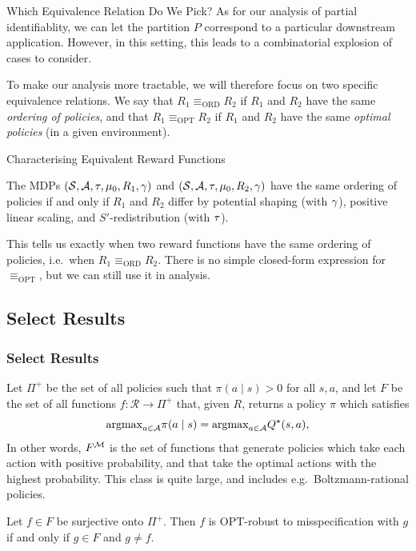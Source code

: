 \documentclass{beamer}
\begin{document}
\begin{frame}{Which Equivalence Relation Do We Pick?}
    \small
    As for our analysis of partial identifiablity, we can let the partition $P$ correspond to a particular downstream application. However, in this setting, this leads to a combinatorial explosion of cases to consider.

    \vspace{0.5cm}
    To make our analysis more tractable, we will therefore focus on two specific equivalence relations. We say that $R_1 \equiv_\mathrm{ORD} R_2$ if $R_1$ and $R_2$ have the same \emph{ordering of policies}, and that $R_1 \equiv_\mathrm{OPT} R_2$ if $R_1$ and $R_2$ have the same \emph{optimal policies} (in a given environment).
\end{frame}

\begin{frame}{Characterising Equivalent Reward Functions}
    \small
    \begin{theorem}%
    The MDPs $(\mathcal{S}, \mathcal{A}, \tau, \mu_0, 
    R_1, \gamma)$ and $(\mathcal{S}, \mathcal{A}, \tau, \mu_0, 
    R_2, \gamma)$ have the same ordering of policies if and only if $R_1$ and $R_2$ differ by potential shaping (with $\gamma$), positive linear scaling, and $S'$-redistribution (with $\tau$).%
    \end{theorem}
    \vspace{0.5cm}
    This tells us exactly when two reward functions have the same ordering of policies, i.e.\ when $R_1 \equiv_\mathrm{ORD} R_2$. There is no simple closed-form expression for $\equiv_\mathrm{OPT}$, but we can still use it in analysis.
\end{frame}

\subsection{Select Results}

\begin{frame}
    \frametitle{Select Results}
    \small
    Let $\Pi^+$ be the set of all policies such that $\pi(a \mid s) > 0$ for all $s,a$, and let $F$ be the set of all functions $f : \mathcal{R} \rightarrow \Pi^+$ that, given $R$, returns a policy $\pi$ which satisfies
    \begin{equation*}
        \mathrm{argmax}_{a \in \mathcal{A}} \pi(a \mid s) = \mathrm{argmax}_{a \in \mathcal{A}} Q^\star(s,a), 
    \end{equation*}
    In other words, $F^{\mathcal{M}}$ is the set of functions that generate policies which take each action with positive probability, and that take the optimal actions with the highest probability. 
    This class is quite large, and includes e.g.\ Boltzmann-rational policies.

    \begin{theorem}\label{thm:boltzmann_weak_robustness}
    Let $f \in F$ be surjective onto $\Pi^+$. Then $f$ is $\mathrm{OPT}$-robust to misspecification with $g$ if and only if $g \in F$ and $g \neq f$.
    \end{theorem} 
\end{frame}
\end{document}
